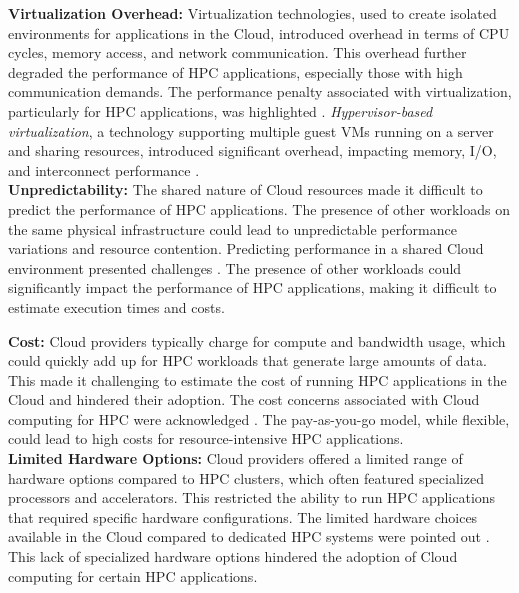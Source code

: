     \noindent
    \textbf{Virtualization Overhead:} Virtualization technologies, used to create isolated environments for applications in the Cloud, introduced overhead in terms of CPU cycles, memory access, and network communication. This overhead further degraded the performance of HPC applications, especially those with high communication demands. The performance penalty associated with virtualization, particularly for HPC applications, was highlighted \cite{jackson2010performance}. \textit{Hypervisor-based virtualization}, a technology supporting multiple guest VMs running on a server and sharing resources, introduced significant overhead, impacting memory, I/O, and interconnect performance \cite{babu2014hypervisor, yunge2011cloud}. \\

    \noindent
    \textbf{Unpredictability:} The shared nature of Cloud resources made it difficult to predict the performance of HPC applications. The presence of other workloads on the same physical infrastructure could lead to unpredictable performance variations and resource contention. Predicting performance in a shared Cloud environment presented challenges \cite{gupta2014challenges, marathe2013challenges}. The presence of other workloads could significantly impact the performance of HPC applications, making it difficult to estimate execution times and costs.

    \noindent
    \textbf{Cost:} Cloud providers typically charge for compute and bandwidth usage, which could quickly add up for HPC workloads that generate large amounts of data. This made it challenging to estimate the cost of running HPC applications in the Cloud and hindered their adoption. The cost concerns associated with Cloud computing for HPC were acknowledged \cite{jackson2010performance, gupta2014challenges, marathe2013challenges}. The pay-as-you-go model, while flexible, could lead to high costs for resource-intensive HPC applications. \\

    \noindent
    \textbf{Limited Hardware Options:} Cloud providers offered a limited range of hardware options compared to HPC clusters, which often featured specialized processors and accelerators. This restricted the ability to run HPC applications that required specific hardware configurations. The limited hardware choices available in the Cloud compared to dedicated HPC systems were pointed out \cite{gupta2014challenges, marathe2013challenges}. This lack of specialized hardware options hindered the adoption of Cloud computing for certain HPC applications. \\

